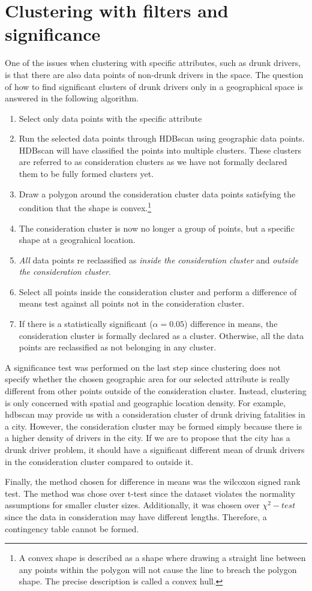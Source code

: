\documentclass{article}
\begin{document}
\section{Clustering with filters and significance}
One of the issues when clustering with specific attributes, such as drunk drivers, is that there are also data points of non-drunk drivers in the space. The question of how to find significant clusters of drunk drivers only in a geographical space is answered in the following algorithm.
\begin{enumerate}
\item Select only data points with the specific attribute
\item Run the selected data points through HDBscan using geographic data points. HDBscan will have classified the points into multiple clusters. These clusters are referred to as consideration clusters as we have not formally declared them to be fully formed clusters yet.
\item Draw a polygon around the consideration cluster data points satisfying the condition that the shape is convex.\footnote{A convex shape is described as a shape where drawing a straight line between any points within the polygon will not cause the line to breach the polygon shape. The precise description is called a convex hull.}
\item The  consideration cluster is now no longer a group of points, but a specific shape at a geograhical location.
\item \textit{All} data points re reclassified as \textit{inside the consideration cluster} and \textit{outside the consideration cluster}.
\item Select all points inside the consideration cluster and perform a difference of means test against all points not in the consideration cluster.
\item If there is a statistically significant ($\alpha = 0.05$) difference in means, the consideration cluster is formally declared as a cluster. Otherwise, all the data points are reclassified as not belonging in any cluster. 
\end{enumerate}
A significance test was performed on the last step since clustering does not specify whether the chosen geographic area for our selected attribute is really different from other points outside of the consideration cluster. Instead, clustering is only concerned with spatial and geographic location density. For example, hdbscan may provide us with a consideration cluster of drunk driving fatalities in a city. However, the consideration cluster may be formed simply because there is a higher density of drivers in the city. If we are to propose that the city has a drunk driver problem, it should have a significant different mean of drunk drivers in the consideration cluster compared to outside it.

Finally, the method chosen for difference in means was the wilcoxon signed rank test. The method was chose over t-test since the dataset violates the normality assumptions for smaller cluster sizes. Additionally, it was chosen over $\chi^2-test$ since the data in consideration may have different lengths. Therefore, a contingency table cannot be formed.
\end{document}
